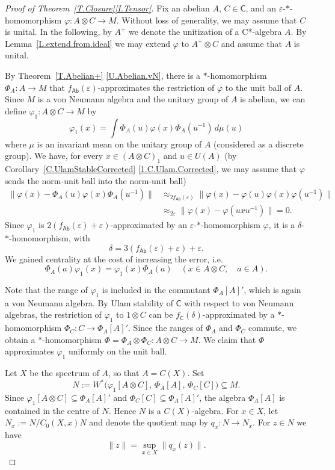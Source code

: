 \documentclass[11pt]{amsproc}
\newcommand{\cstar}{C*}
\newcommand{\sfC}{\mathsf C}
\DeclareMathOperator{\sfCOM}{\mathsf {Ab}}
\theoremstyle{definition}
\theoremstyle{plain}
\theoremstyle{remark}
\begin{document}
\begin{proof}[Proof of Theorem~\ref{T.Closure}\eqref{I.Tensor}] 
	Fix an abelian $A$, $C\in \sfC$, and an $\varepsilon$-$*$-homomorphism $\varphi\colon A\otimes  C\to M$. Without loss of generality, we may assume that $C$ is unital.
	In the following, by  $A^+$ we denote the unitization of a \cstar-algebra $A$.  
	By Lemma~\ref{L.extend.from.ideal} we may extend $\varphi$ to $A^+\otimes C$ and assume that $A$ is unital. 
	
	By Theorem~\ref{T.Abelian+} \eqref{U.Abelian.vN}, there is a $*$-homomorphism $\Phi_A\colon A\to M$ that $f_{\sfCOM}(\varepsilon)$-approximates the restriction of $\varphi$ to the unit ball of $A$. Since $M$ is a von Neumann algebra and the unitary group of $A$ is abelian, we can define $\varphi_1\colon A\otimes C\to M$ by  
	\[
	\varphi_1(x)=\int \Phi_A(u)\varphi(x)\Phi_A(u^{-1})\, d\mu(u)
	\]
	where $\mu$ is an invariant mean on the unitary group of $A$ (considered as a discrete group). We have, for every $x\in (A\otimes C)_1$ and $u\in U(A)$ (by Corollary~\ref{C.UlamStableCorrected}   \eqref{1.C.Ulam.Corrected}, 
	 we may assume that $\varphi$ sends the norm-unit ball into the norm-unit ball)
	\begin{align*}
		\|\varphi(x)-\Phi_A(u)\varphi(x)\Phi_A(u^{-1})\|
		&\approx_{2f_{\sfCOM}(\varepsilon)} 
		\|\varphi(x)-\varphi(u)\varphi(x)\varphi(u^{-1})\|\\
		&\approx_{2\varepsilon}
		\|\varphi(x)-\varphi(uxu^{-1})\|=0. 
	\end{align*}
	Since $\varphi_1$ is $2(f_{\sfCOM}(\varepsilon)+\varepsilon)$-approximated by an $\varepsilon$-$*$-homomorphism $\varphi$, it is a $\delta$-$*$-homomorphism, with 
	\[
	\delta=3(f_{\sfCOM}(\varepsilon)+\varepsilon)+\varepsilon. 
	\]
	We gained centrality at the cost of increasing the error, i.e.
	$$\Phi_A(a)\varphi_1(x) = \varphi_1(x)\Phi_A(a) \quad (x \in A \otimes C, \quad a \in A).$$
	
	Note that the range of $\varphi_1$ is included in the commutant
	$\Phi_A[A]'$, which is again a von Neumann algebra.
	By Ulam stability of $\sfC$ with respect to von Neumann algebras,
	the restriction of $\varphi_1$ to $1\otimes C$ can be
	$f_{\sfC}(\delta)$-approximated by a $*$-homomorphism
	$
		\Phi_C\colon C\to \Phi_A[A]'.
	$
	Since the ranges of $\Phi_A$ and $\Phi_C$ commute, we obtain a
	$*$-homomorphism
	$
		\Phi=\Phi_A\otimes \Phi_C\colon A\otimes C\to M.
	$
	We claim that $\Phi$ approximates $\varphi_1$ uniformly on the unit ball.

	Let $X$ be the spectrum of $A$, so that $A=C(X)$.
	Set
	\[
		N:=W^*\bigl(\varphi_1[A\otimes C],\,\Phi_A[A],\,\Phi_C[C]\bigr)
		\subseteq M.
	\]
	Since $\varphi_1[A\otimes C]\subseteq \Phi_A[A]'$ and
	$\Phi_C[C]\subseteq \Phi_A[A]'$, the algebra $\Phi_A[A]$ is contained
	in the centre of $N$. Hence $N$ is a $C(X)$-algebra. For $x\in X$, let
	$
		N_x:=N/C_0(X,x)N
	$
	and denote the quotient map by $q_x\colon N\to N_x$.
	For $z\in N$ we have
	\[
		\|z\|=\sup_{x\in X}\|q_x(z)\|.
	\]


\end{proof}
\end{document}
